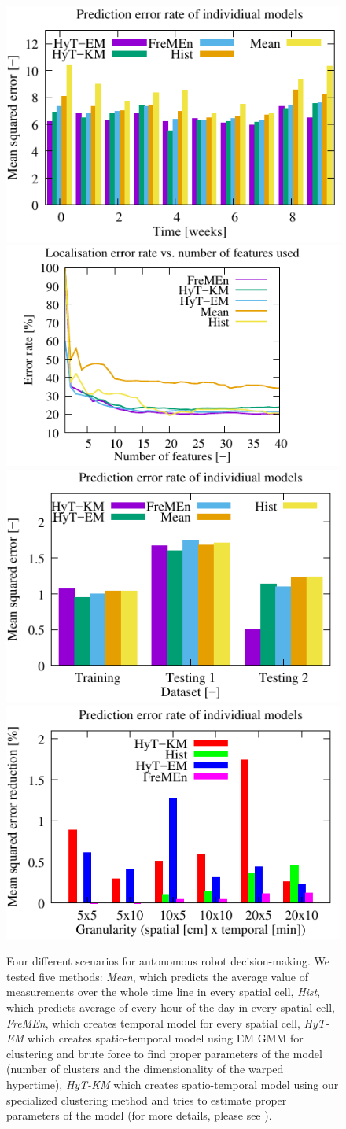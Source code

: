\begin{figure}[!b]
   \begin{center}
      \includegraphics[width=0.45\columnwidth]{fig/door_graph}
    \hfill
      \includegraphics[width=0.45\columnwidth]{fig/localisation_graph}\\\vspace{5mm}
      \includegraphics[width=0.45\columnwidth]{fig/nav_graph}
    \hfill
      \includegraphics[width=0.45\columnwidth]{fig/ped_graph}
    \caption{Four different scenarios for autonomous robot decision-making. We tested five methods: \textit{Mean}, which predicts the average value of measurements over the whole time line in every spatial cell, \textit{Hist}, which predicts average of every hour of the day in every spatial cell, \textit{FreMEn}, which creates temporal model for every spatial cell, \textit{HyT-EM} which creates spatio-temporal model using EM GMM for clustering and brute force to find proper parameters of the model (number of clusters and the dimensionality of the warped hypertime), \textit{HyT-KM} which creates spatio-temporal model using our specialized clustering method and tries to estimate proper parameters of the model (for more details, please see \cite{krajnik2018warped}).\\
}
\end{center}
\end{figure}
